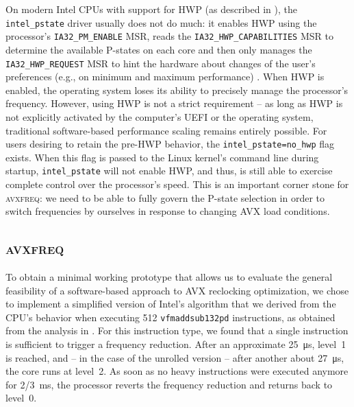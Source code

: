 On modern Intel \glspl{CPU} with support for \gls{HWP} (as described in ), the \texttt{intel\_pstate} driver usually does not do much: it enables \gls{HWP} using the processor's \texttt{IA32\_PM\_ENABLE} \gls{MSR}, reads the \texttt{IA32\_HWP\_CAPABILITIES} \gls{MSR} to determine the available \glspl{P-state} on each core and then only manages the \texttt{IA32\_HWP\_REQUEST} \gls{MSR} to hint the hardware about changes of the user's preferences (e.g., on minimum and maximum performance) \cite{intelsdmsysprogguide} \cite{intelpstate}. When \gls{HWP} is enabled, the operating system loses its ability to precisely manage the processor's frequency. However, using \gls{HWP} is not a strict requirement -- as long as \gls{HWP} is not explicitly activated by the computer's \gls{UEFI} or the operating system, traditional software-based performance scaling remains entirely possible. For users desiring to retain the pre-\gls{HWP} behavior, the \texttt{intel\_pstate=no\_hwp} flag exists. When this flag is passed to the Linux kernel's command line during startup, \texttt{intel\_pstate} will not enable \gls{HWP}, and thus, is still able to exercise complete control over the processor's speed. This is an important corner stone for \textsc{avxfreq}: we need to be able to fully govern the \gls{P-state} selection in order to switch frequencies by ourselves in response to changing \gls{AVX} load conditions.

\subsection{\textsc{avxfreq}}

To obtain a minimal working prototype that allows us to evaluate the general feasibility of a software-based approach to \gls{AVX} reclocking optimization, we chose to implement a simplified version of Intel's algorithm that we derived from the \gls{CPU}'s behavior when executing \SI{512}{\bit} \texttt{vfmaddsub132pd} instructions, as obtained from the analysis in . For this instruction type, we found that a single instruction is sufficient to trigger a frequency reduction. After an approximate \SI{25}{\micro\second}, level~1 is reached, and -- in the case of the unrolled version -- after another about \SI{27}{\micro\second}, the core runs at level~2. As soon as no heavy instructions were executed anymore for \SI[quotient-mode=fraction]{2/3}{\milli\second}, the processor reverts the frequency reduction and returns back to level~0. %

